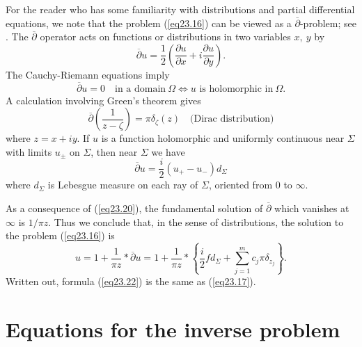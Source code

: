 \documentclass{surv-l}
\theoremstyle{plain}
\theoremstyle{definition}
\numberwithin{equation}{chapter}
\begin{document}
For the reader who has some familiarity with distributions and partial differential equations, we note that the problem (\ref{eq23.16}) can be viewed as a $\overline{\partial}$-problem;  see \cite[Chapter 1]{Ho}. The $\overline{\partial}$ operator acts on functions or distributions in two variables $x,\ y$ by
\renewcommand\theequation{23.18}
\setcounter{equation}{17}
\begin{equation}\label{eq23.18}
\overline{\partial}u=\frac{1}{2}\left(\frac{\partial u}{\partial x}+i\frac{\partial u}{\partial y}\right).
\end{equation}
The Cauchy-Riemann equations imply
\renewcommand\theequation{23.19}
\setcounter{equation}{18}
\begin{equation}\label{eq23.19}
\overline{\partial}u=0\quad \text{in a domain}\ \Omega\Leftrightarrow u \text{ is holomorphic in}\ \Omega.
\end{equation}
A calculation involving Green's theorem gives
\renewcommand\theequation{23.20}
\setcounter{equation}{19}
\begin{equation}\label{eq23.20}
\overline{\partial}\left(\frac{1}{z-\zeta}\right)=\pi\delta_{\zeta}(z)\quad \text{(Dirac distribution)}
\end{equation}
where $z=x+iy$. If $u$ is a function holomorphic and uniformly continuous near $\Sigma$ with limits $u_{\pm}$ on $\Sigma$, then near $\Sigma$ we have
\renewcommand\theequation{23.21}
\setcounter{equation}{20}
\begin{equation}\label{eq23.21}
\overline{\partial}u=\frac{i}{2}(u_{+}-u_{-})d_{\Sigma}
\end{equation}
where $d_{\Sigma}$ is Lebesgue measure on each ray of $\Sigma$, oriented from $0$ to $\infty$.

As a consequence of (\ref{eq23.20}), the fundamental solution of $\overline{\partial}$ which vanishes at $\infty$ is $1/\pi z$. Thus we conclude that, in the sense of distributions, the solution to the problem (\ref{eq23.16}) is
\renewcommand\theequation{23.22}
\setcounter{equation}{21}
\begin{equation}\label{eq23.22}
u=1+\frac{1}{\pi z}\ast\overline{\partial}u=1+\frac{1}{\pi z} \ast\left\{\frac{i}{2}fd_{\Sigma}+\sum_{j=1}^{m}c_{j}\pi\delta_{z_{j}}\right\}.
\end{equation}
Written out, formula (\ref{eq23.22}) is the same as (\ref{eq23.17}).

\section[Equations for the Inverse Problem]{Equations for the inverse problem}\label{sec24}
\end{document}
